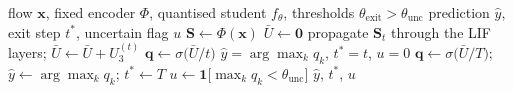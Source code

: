 \begin{algorithm}[!t]
\caption{Deployment inference with confidence-triggered early exit
         (no tree at runtime)}
\label{alg:treespike_deploy}
\begin{algorithmic}[1]
\Require flow $\mathbf{x}$, fixed encoder $\Phi$, quantised student
         $f_{\theta}$, thresholds $\theta_{\mathrm{exit}} > \theta_{\mathrm{unc}}$
\Ensure prediction $\hat{y}$, exit step $t^{*}$, uncertain flag $u$
\State $\mathbf{S} \gets \Phi(\mathbf{x})$
\State $\bar{U} \gets \mathbf{0}$
  \State propagate $\mathbf{S}_{t}$ through the LIF layers;
         $\bar{U} \gets \bar{U} + U^{(t)}_{3}$
  \State $\mathbf{q} \gets \sigma\bigl(\bar{U}/t\bigr)$
    \State \Return $\hat{y} = \arg\max_k q_k$,\; $t^{*} = t$,\; $u = 0$
  \EndIf
\EndFor
\State $\mathbf{q} \gets \sigma\bigl(\bar{U}/T\bigr)$;\;
       $\hat{y} \gets \arg\max_k q_k$;\; $t^{*} \gets T$
\State $u \gets \mathbf{1}\bigl[\max_k q_k < \theta_{\mathrm{unc}}\bigr]$
\State \Return $\hat{y}$, $t^{*}$, $u$
\end{algorithmic}
\end{algorithm}
